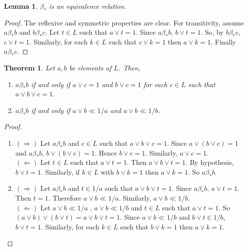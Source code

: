\documentclass[11pt,reqno]{amsart} %
\theoremstyle{plain}
\newtheorem{theorem}{Theorem}
\newtheorem{lemma}{Lemma}
\theoremstyle{definition}
\theoremstyle{remark}
\numberwithin{equation}{section}
\begin{document}
\begin{lemma} \label{2}
  $ \beta_* $ is an equivalence relation.
\end{lemma}
\begin{proof}
  The reflexive and symmetric properties are clear. For transitivity, assume $ a \beta_*b $ and $ b \beta_* c $. 
  Let $ t \in L $ such that $ a \vee t = 1 $. Since $ a \beta_*b $, $ b \vee t = 1 $. So,  by $ b \beta_* c $, 
  $ c \vee t = 1 $. Similarly, for each $ k \in L $ such that $ c \vee k = 1 $ then $ a \vee k=1 $. 
  Finally $ a \beta_* c $.

\end{proof}

\begin{theorem} \label{3}
  Let $ a,b $ be elements of $ L $. Then,
  \begin{enumerate}[label=\textnormal{(\arabic*)}]

    \item
      $ a \beta_* b $ if and only if $ a \vee c = 1 $ and $ b \vee c = 1 $ for each $ c \in L $ 
      such that $ a \vee b  \vee c = 1 $.  \label{3.1}

    \item
      $ a \beta_* b $ if and only if $ a \vee b \ll 1/a $ and $ a \vee b \ll 1/b $.  \label{3.2}

  \end{enumerate}
\end{theorem}


\begin{proof}
  \begin{enumerate}
    \item
      $ ( \Rightarrow ) $
      Let $ a \beta_* b$ and $ c \in L $ such that $ a \vee b \vee c = 1 $. Since $ a \vee ( b \vee c ) = 1 $ and 
      $ a \beta_* b $, $ b \vee ( b \vee c ) = 1 $. Hence $ b \vee c = 1 $. Similarly, $ a \vee c = 1 $. \\
      $( \Leftarrow )$
      Let $ t \in L $ such that $ a \vee t = 1 $. 
      Then $ a \vee b \vee t = 1 $. By hypothesis, $ b \vee t = 1 $. 
      Similarly, if $ k \in L $ with $ b \vee k = 1 $ then $ a \vee k = 1 $. So $ a \beta_* b $.
    \item
      $ ( \Rightarrow ) $
      Let $ a \beta_* b $ and $ t \in 1/a $ such that $ a \vee b \vee t = 1 $. Since $ a \beta_* b $, $ a \vee t = 1 $. 
      Then $ t=1 $. Therefore $ a \vee b \ll 1/a $. Similarly, $ a \vee b \ll 1/b $. \\
      $( \Leftarrow )$
      Let $ a \vee b \ll 1/a $ , $ a \vee b \ll 1/b $ and $ t \in L $ such that $ a \vee t = 1 $. 
      So $ ( a \vee b ) \vee ( b \vee t ) = a \vee b \vee t = 1 $. Since $ a \vee b \ll 1/b $ and 
      $ b \vee t \in 1/b $, $ b \vee t = 1 $. 
      Similarly, for each $ k \in L $ such that $ b \vee k = 1 $ then $ a \vee k = 1 $. 
  \end{enumerate}
\end{proof}
\end{document}
